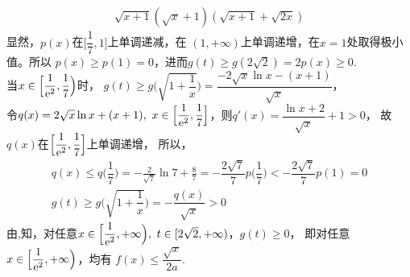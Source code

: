 \begin{enumerate}[label={【\textbf{例\thechapter.\arabic*}】},
 leftmargin=\inteval{\myenumleftmargin}pt,
 itemsep=\inteval{\myenumitempsep}pt,
 itemindent=\inteval{\myenumitemindent}pt]
\begin{align}
{        \sqrt{x+1}(\sqrt{x}+1)(\sqrt{x+1}+\sqrt{2 x})}
    \label{2019浙江复杂因式分解}
\end{align}
显然，$ p(x) $在$ \Big[\dfrac{1}{7},1\Big] $上单调递减，在
$ (1,+\infty) $上单调递增，在$ x=1 $处取得极小值。所以
$ p(x)\geq p(1)=0 $，进而$ g(t)\geq g(2\sqrt{2})=2p(x)\geq 0 $.\\
 当$x\in\Big[\dfrac{1}{\mathrm{e}^{2}},\dfrac{1}{7}\Big)$时，
$ g(t)\geqslant g\Big(\sqrt{1+\dfrac{1}{x}}\Big)=\dfrac{-2\sqrt{x}
    \ln x-(x+1)}{\sqrt{x}}$，\\
令$ q(x)=2\sqrt{x}\ln x+(x+1),\ x\in\Big[\dfrac{1}{\e^{2}},
\dfrac{1}{7}\Big] $，则$ q'(x)=\dfrac{\ln x+2}{\sqrt{x}}+1>0 $，
故$q(x)$在$\Big[\dfrac{1}{\mathrm{e}^{2}},\dfrac{1}{7}\Big]$上单调递增，
所以，
\begin{gather}
    q(x)\leqslant q\Big(\dfrac{1}{7}\Big)=-\frac{2}{\sqrt{7}}
    \ln 7+\frac{8}{7}=-\dfrac{2\sqrt{7}}{7} p\Big(\dfrac{1}{7}\Big)<-\dfrac{2\sqrt{7}}{7} p(1)=0 
    \label{2019浙江估计q(1_7)}\\
    g(t)\geqslant g\Big(\sqrt{1+\dfrac{1}{x}}\Big)=
    -\dfrac{q(x)}{\sqrt{x}}>0 \nonumber
\end{gather}
由,知，对任意$ x\in\Big[\dfrac{1}{\mathrm{e}^{2}},
+\infty\Big),\ t\in[2\sqrt{2}, +\infty)$，$ g(t)\geqslant 0 $，
即对任意$ x\in\Big[\dfrac{1}{\mathrm{e}^{2}},+\infty\Big)$，均有
$ f(x)\leqslant\dfrac{\sqrt{x}}{2a} $.


\end{enumerate}

